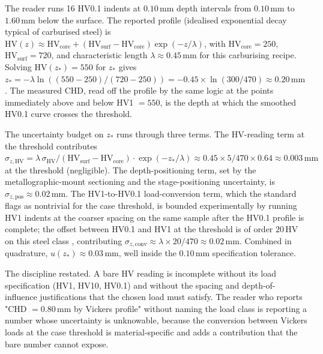 The reader runs 16 HV0.1 indents at $0.10 \,\si{\milli\meter}$
depth intervals from $0.10 \,\si{\milli\meter}$ to $1.60 \,\si
{\milli\meter}$ below the surface. The reported profile (idealised
exponential decay typical of carburised steel) is
$\mathrm{HV}(z) \approx \mathrm{HV}_{\mathrm{core}} + (\mathrm{HV}
_{\mathrm{surf}} - \mathrm{HV}_{\mathrm{core}})
\exp(-z / \lambda)$, with $\mathrm{HV}_{\mathrm{core}} = 250$,
$\mathrm{HV}_{\mathrm{surf}} = 720$, and characteristic length
$\lambda \approx 0.45 \,\si{\milli\meter}$ for this carburising
recipe. Solving $\mathrm{HV}(z_{*}) = 550$ for $z_{*}$ gives
$z_{*} = -\lambda \ln((550 - 250)/(720 - 250)) = -0.45 \times
\ln(300/470) \approx 0.20 \,\si{\milli\meter}$. The measured CHD,
read off the profile by the same logic at the points immediately
above and below HV1 $= 550$, is the depth at which the smoothed
HV0.1 curve crosses the threshold.

The uncertainty budget on $z_{*}$ runs through three terms. The
HV-reading term at the threshold contributes
$\sigma_{z, \mathrm{HV}} = \lambda \, \sigma_{\mathrm{HV}} /
(\mathrm{HV}_{\mathrm{surf}} - \mathrm{HV}_{\mathrm{core}}) \cdot
\exp(-z_{*}/\lambda) \approx 0.45 \times 5 / 470 \times 0.64
\approx 0.003 \,\si{\milli\meter}$ at the threshold (negligible).
The depth-positioning term, set by the metallographic-mount
sectioning and the stage-positioning uncertainty, is $\sigma_{z,
\mathrm{pos}} \approx 0.02 \,\si{\milli\meter}$. The HV1-to-HV0.1
load-conversion term, which the standard
\cite{ch07-std:astm-e384-2022} flags as nontrivial for the case
threshold, is bounded experimentally by running HV1 indents at the
coarser spacing on the same sample after the HV0.1 profile is
complete; the offset between HV0.1 and HV1 at the threshold is of
order $20 \,\text{HV}$ on this steel class
\cite{ch07-paper:vickers-case-depth-2018}, contributing
$\sigma_{z, \mathrm{conv}} \approx \lambda \times 20 / 470 \approx
0.02 \,\si{\milli\meter}$. Combined in quadrature, $u(z_{*})
\approx 0.03 \,\si{\milli\meter}$, well inside the
$0.10 \,\si{\milli\meter}$ specification tolerance.

The discipline restated. A bare HV reading is incomplete without
its load specification (HV1, HV10, HV0.1) and without the spacing
and depth-of-influence justifications that the chosen load must
satisfy. The reader who reports "CHD $= 0.80 \,\si{\milli\meter}$
by Vickers profile" without naming the load class is reporting a
number whose uncertainty is unknowable, because the conversion
between Vickers loads at the case threshold is material-specific
and adds a contribution that the bare number cannot expose.

